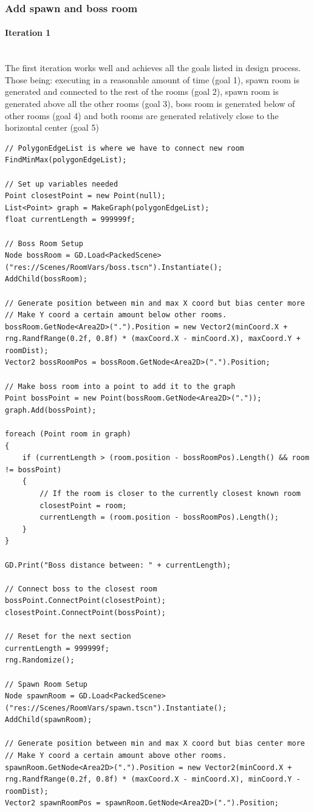 \documentclass{article}
\newcommand{\myparagraph}[1]{\paragraph{#1}\mbox{}\\} %
\begin{document}
\subsubsection{Add spawn and boss room}
\myparagraph{Iteration 1}
The first iteration works well and achieves all the goals listed in design process. Those being: executing in a reasonable amount of time (goal 1), spawn room is generated and connected to the rest of the rooms (goal 2), spawn room is generated above all the other rooms (goal 3), boss room is generated below of other rooms (goal 4) and both rooms are generated relatively close to the horizontal center (goal 5)
\begin{lstlisting}
// PolygonEdgeList is where we have to connect new room
FindMinMax(polygonEdgeList);

// Set up variables needed
Point closestPoint = new Point(null);
List<Point> graph = MakeGraph(polygonEdgeList);
float currentLength = 999999f;

// Boss Room Setup
Node bossRoom = GD.Load<PackedScene>("res://Scenes/RoomVars/boss.tscn").Instantiate();
AddChild(bossRoom);

// Generate position between min and max X coord but bias center more
// Make Y coord a certain amount below other rooms.
bossRoom.GetNode<Area2D>(".").Position = new Vector2(minCoord.X + rng.RandfRange(0.2f, 0.8f) * (maxCoord.X - minCoord.X), maxCoord.Y + roomDist);
Vector2 bossRoomPos = bossRoom.GetNode<Area2D>(".").Position;

// Make boss room into a point to add it to the graph
Point bossPoint = new Point(bossRoom.GetNode<Area2D>("."));
graph.Add(bossPoint);

foreach (Point room in graph)
{
    if (currentLength > (room.position - bossRoomPos).Length() && room != bossPoint)
    {
        // If the room is closer to the currently closest known room
        closestPoint = room;
        currentLength = (room.position - bossRoomPos).Length();
    }
}

GD.Print("Boss distance between: " + currentLength);

// Connect boss to the closest room
bossPoint.ConnectPoint(closestPoint);
closestPoint.ConnectPoint(bossPoint);

// Reset for the next section
currentLength = 999999f;
rng.Randomize();

// Spawn Room Setup
Node spawnRoom = GD.Load<PackedScene>("res://Scenes/RoomVars/spawn.tscn").Instantiate();
AddChild(spawnRoom);

// Generate position between min and max X coord but bias center more
// Make Y coord a certain amount above other rooms.
spawnRoom.GetNode<Area2D>(".").Position = new Vector2(minCoord.X + rng.RandfRange(0.2f, 0.8f) * (maxCoord.X - minCoord.X), minCoord.Y - roomDist);
Vector2 spawnRoomPos = spawnRoom.GetNode<Area2D>(".").Position;


\end{lstlisting}
\end{document}
